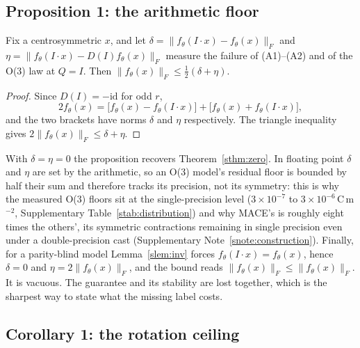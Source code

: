 \subsection*{Proposition 1: the arithmetic floor}

\begin{proposition}\label{sprop:floor}
Fix a centrosymmetric $x$, and let $\delta = \lVert f_\theta(I\!\cdot\!x) - f_\theta(x)\rVert_F$ and $\eta = \lVert f_\theta(I\!\cdot\!x) - D(I) f_\theta(x)\rVert_F$ measure the failure of (A1)--(A2) and of the O(3) law at $Q=I$. Then $\lVert f_\theta(x)\rVert_F \le \tfrac{1}{2}(\delta + \eta)$.
\end{proposition}

\begin{proof}
Since $D(I) = -\mathrm{id}$ for odd $r$,
\[
2 f_\theta(x) = \bigl[f_\theta(x) - f_\theta(I\!\cdot\!x)\bigr] + \bigl[f_\theta(x) + f_\theta(I\!\cdot\!x)\bigr],
\]
and the two brackets have norms $\delta$ and $\eta$ respectively. The triangle inequality gives $2\lVert f_\theta(x)\rVert_F \le \delta + \eta$.
\end{proof}

With $\delta=\eta=0$ the proposition recovers Theorem~\ref{sthm:zero}. In floating point $\delta$ and $\eta$ are set by the arithmetic, so an O(3) model's residual floor is bounded by half their sum and therefore tracks its precision, not its symmetry: this is why the measured O(3) floors sit at the single-precision level ($3\times10^{-7}$ to $3\times10^{-6}$\,C\,m$^{-2}$, Supplementary Table~\ref{stab:distribution}) and why MACE's is roughly eight times the others', its symmetric contractions remaining in single precision even under a double-precision cast (Supplementary Note~\ref{snote:construction}). Finally, for a parity-blind model Lemma~\ref{slem:inv} forces $f_\theta(I\!\cdot\!x)=f_\theta(x)$, hence $\delta=0$ and $\eta = 2\lVert f_\theta(x)\rVert_F$, and the bound reads $\lVert f_\theta(x)\rVert_F \le \lVert f_\theta(x)\rVert_F$. It is vacuous. The guarantee and its stability are lost together, which is the sharpest way to state what the missing label costs.

\subsection*{Corollary 1: the rotation ceiling}

